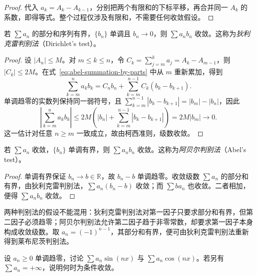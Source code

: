 \begin{proof}
代入 $a_k=A_k-A_{k-1}$，分别把两个有限和的下标平移，再合并同一 $A_k$ 的系数，即得等式。整个过程仅涉及有限和，不需要任何收敛假设。
\end{proof}

\begin{theorem}[狄利克雷判别法]
\label{thm:dirichlet-test-for-series}
若 $\sum a_n$ 的部分和序列有界，$\{b_n\}$ 单调且 $b_n\to0$，则 $\sum a_nb_n$ 收敛。这称为\emph{狄利克雷判别法}（Dirichlet's test）。
\end{theorem}

\begin{proof}
设 $|A_n|\leq M$。对 $m\leq k\leq n$，令 $C_k=\sum_{j=m}^k a_j=A_k-A_{m-1}$，则 $|C_k|\leq2M$。在式~\eqref{eq:abel-summation-by-parts} 中从 $m$ 重新累加，得到
\[
    \sum_{k=m}^n a_kb_k=C_nb_n+\sum_{k=m}^{n-1}C_k(b_k-b_{k+1}).
\]
单调趋零的实数列保持同一弱符号，且
$\sum_{k=m}^{n-1}|b_k-b_{k+1}|=|b_m|-|b_n|$，因此
\[
    \left|\sum_{k=m}^n a_kb_k\right|
      \leq2M\left(|b_n|+\sum_{k=m}^{n-1}|b_k-b_{k+1}|\right)
      =2M|b_m|\longrightarrow0.
\]
这一估计对任意 $n\geq m$ 一致成立，故由柯西准则，级数收敛。
\end{proof}

\begin{theorem}[阿贝尔判别法]
\label{thm:abel-test-for-series}
若 $\sum a_n$ 收敛，$\{b_n\}$ 单调有界，则 $\sum a_nb_n$ 收敛。这称为\emph{阿贝尔判别法}（Abel's test）。
\end{theorem}

\begin{proof}
单调有界保证 $b_n\to b\in\mathbb R$，故 $b_n-b$ 单调趋零。收敛级数 $\sum a_n$ 的部分和有界，由狄利克雷判别法，$\sum a_n(b_n-b)$ 收敛；而 $\sum ba_n$ 也收敛。二者相加，便得 $\sum a_nb_n$ 收敛。
\end{proof}

两种判别法的假设不能混用：狄利克雷判别法对第一因子只要求部分和有界，但第二因子必须趋零；阿贝尔判别法允许第二因子趋于非零常数，却要求第一因子本身构成收敛级数。取 $a_n=(-1)^{n-1}$，其部分和有界，便可由狄利克雷判别法重新得到莱布尼茨判别法。

\begin{example}
\label{ex:dirichlet-trigonometric-series}
设 $a_n\geq0$ 单调趋零，讨论 $\sum a_n\sin(nx)$ 与 $\sum a_n\cos(nx)$。若另有 $\sum a_n=+\infty$，说明何时为条件收敛。
\end{example}

